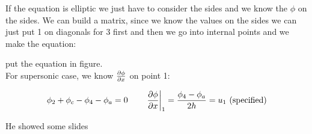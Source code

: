 If the equation is elliptic we just have to consider the sides and we know the $\phi$ on the sides. We can build a matrix, since we know the values on the sides we can just put 1 on diagonals for 3 first and then we go into internal points and we make the equation: 

put the equation in figure. \\

For supersonic case, we know $\frac{\partial \phi }{\partial x}$ on point 1: 

\begin{equation}
\phi _2 + \phi _c - \phi _4 - \phi _a = 0 \qquad \left.\frac{\partial \phi}{\partial x} \right| _1 = \frac{\phi _4 - \phi _a}{2h} = u_1 \mbox{ (specified)}
\end{equation}

He showed some slides 


